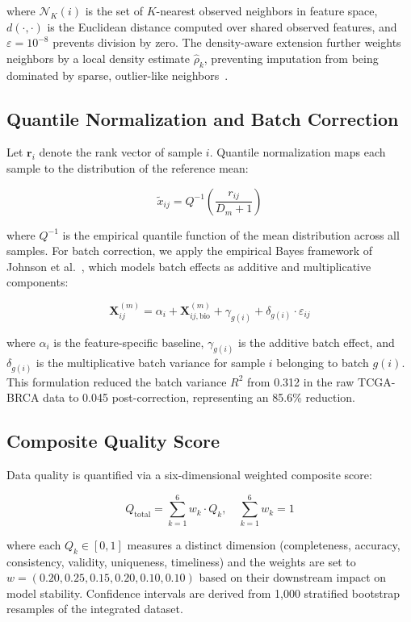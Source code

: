 \documentclass[twocolumn]{article}
\begin{document}
where $\mathcal{N}_K(i)$ is the set of $K$-nearest observed neighbors in feature space, $d(\cdot,\cdot)$ is the Euclidean distance computed over shared observed features, and $\varepsilon = 10^{-8}$ prevents division by zero. The density-aware extension further weights neighbors by a local density estimate $\hat{\rho}_k$, preventing imputation from being dominated by sparse, outlier-like neighbors~\cite{troyanskaya2001}.

\subsection{Quantile Normalization and Batch Correction}
Let $\mathbf{r}_i$ denote the rank vector of sample $i$. Quantile normalization maps each sample to the distribution of the reference mean:

\begin{equation}
\tilde{x}_{ij} = Q^{-1}\left(\frac{r_{ij}}{D_m + 1}\right)
\end{equation}

where $Q^{-1}$ is the empirical quantile function of the mean distribution across all samples. For batch correction, we apply the empirical Bayes framework of Johnson et al.~\cite{johnson2007}, which models batch effects as additive and multiplicative components:

\begin{equation}
\mathbf{X}^{(m)}_{ij} = \alpha_i + \mathbf{X}^{(m)}_{ij,\text{bio}} + \gamma_{g(i)} + \delta_{g(i)} \cdot \varepsilon_{ij}
\end{equation}

where $\alpha_i$ is the feature-specific baseline, $\gamma_{g(i)}$ is the additive batch effect, and $\delta_{g(i)}$ is the multiplicative batch variance for sample $i$ belonging to batch $g(i)$. This formulation reduced the batch variance $R^2$ from 0.312 in the raw TCGA-BRCA data to 0.045 post-correction, representing an 85.6\% reduction.

\subsection{Composite Quality Score}
Data quality is quantified via a six-dimensional weighted composite score:

\begin{equation}
Q_{\text{total}} = \sum_{k=1}^{6} w_k \cdot Q_k, \quad \sum_{k=1}^{6} w_k = 1
\end{equation}

where each $Q_k \in [0,1]$ measures a distinct dimension (completeness, accuracy, consistency, validity, uniqueness, timeliness) and the weights are set to $w = (0.20, 0.25, 0.15, 0.20, 0.10, 0.10)$ based on their downstream impact on model stability. Confidence intervals are derived from 1,000 stratified bootstrap resamples of the integrated dataset.
\end{document}
